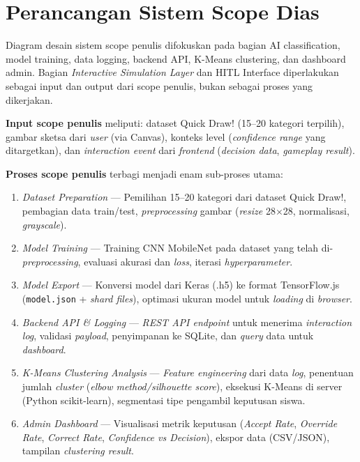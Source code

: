 \documentclass[10pt,twoside,openright]{report}
\begin{document}
\section{Perancangan Sistem Scope Dias}
\label{sec:perancangan-sistem-scope-dias}

Diagram desain sistem scope penulis difokuskan pada bagian AI classification, model training, data logging, backend API, K-Means clustering, dan dashboard admin. Bagian \textit{Interactive Simulation Layer} dan HITL Interface diperlakukan sebagai input dan output dari scope penulis, bukan sebagai proses yang dikerjakan.

\textbf{Input scope penulis} meliputi: dataset Quick Draw! (15--20 kategori terpilih), gambar sketsa dari \textit{user} (via Canvas), konteks level (\textit{confidence range} yang ditargetkan), dan \textit{interaction event} dari \textit{frontend} (\textit{decision data}, \textit{gameplay result}).

\textbf{Proses scope penulis} terbagi menjadi enam sub-proses utama:

\begin{enumerate}
    \item \textit{Dataset Preparation} --- Pemilihan 15--20 kategori dari dataset Quick Draw!, pembagian data train/test, \textit{preprocessing} gambar (\textit{resize} 28$\times$28, normalisasi, \textit{grayscale}).
    \item \textit{Model Training} --- Training CNN MobileNet pada dataset yang telah di-\textit{preprocessing}, evaluasi akurasi dan \textit{loss}, iterasi \textit{hyperparameter}.
    \item \textit{Model Export} --- Konversi model dari Keras (.h5) ke format TensorFlow.js (\texttt{model.json} + \textit{shard files}), optimasi ukuran model untuk \textit{loading} di \textit{browser}.
    \item \textit{Backend API \& Logging} --- \textit{REST API endpoint} untuk menerima \textit{interaction log}, validasi \textit{payload}, penyimpanan ke SQLite, dan \textit{query} data untuk \textit{dashboard}.
    \item \textit{K-Means Clustering Analysis} --- \textit{Feature engineering} dari data \textit{log}, penentuan jumlah \textit{cluster} (\textit{elbow method/silhouette score}), eksekusi K-Means di server (Python scikit-learn), segmentasi tipe pengambil keputusan siswa.
    \item \textit{Admin Dashboard} --- Visualisasi metrik keputusan (\textit{Accept Rate}, \textit{Override Rate}, \textit{Correct Rate}, \textit{Confidence vs Decision}), ekspor data (CSV/JSON), tampilan \textit{clustering result}.
\end{enumerate}
\end{document}
